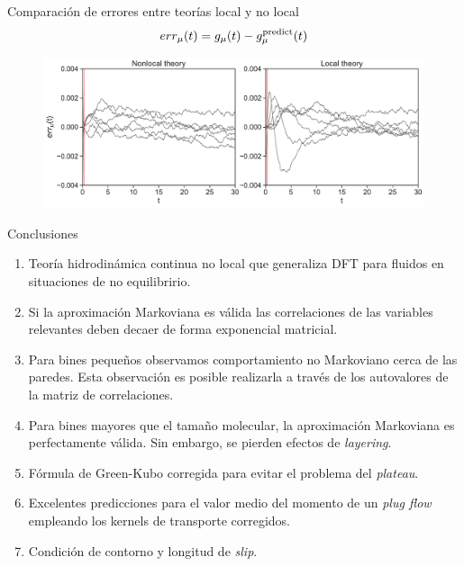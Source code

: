 \documentclass{beamer}
\begin{document}
\begin{frame}{Comparación de errores entre teorías local y no local}
  \begin{align}
  err_\mu(t)=  g_\mu(t)-g^{\rm predict}_\mu(t)
    \nonumber
  \end{align}
    \begin{figure}
\includegraphics[width=\linewidth]{errors-17nodes-WALLS-defense}
\end{figure}
\end{frame}

\begin{frame}{Conclusiones}
  \begin{enumerate}
\item<1-> Teoría hidrodinámica continua no local que generaliza  DFT para fluidos en situaciones de no equilibririo.  
\item<2-> Si la aproximación Markoviana es válida las correlaciones de las variables relevantes deben decaer de forma exponencial matricial.  
\item<3-> Para bines pequeños observamos comportamiento no Markoviano cerca de las paredes. Esta observación es posible realizarla a través de los autovalores de la matriz de correlaciones. 
\item<4-> Para bines mayores que el tamaño molecular, la aproximación Markoviana es perfectamente válida. Sin embargo, se pierden efectos de \textit{layering}.
\item<5-> Fórmula de Green-Kubo corregida para evitar el problema del \textit{plateau}.
\item<6-> Excelentes predicciones para el valor medio del momento de un \textit{plug flow} empleando los kernels de transporte corregidos. 
\item<7-> Condición de contorno y longitud de \textit{slip}. 
  \end{enumerate}

\end{frame}
\end{document}
